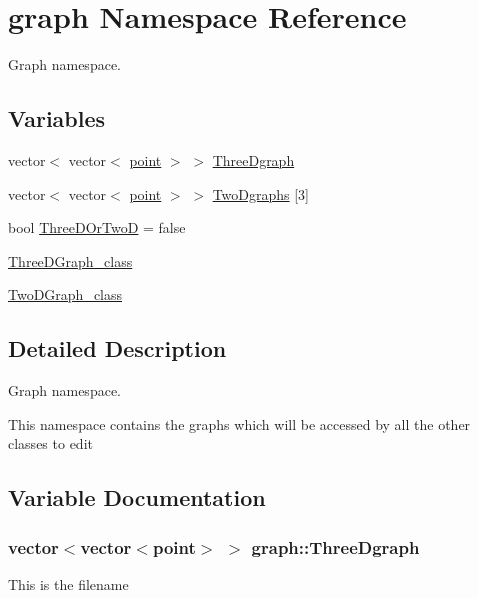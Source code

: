 \hypertarget{namespacegraph}{}\section{graph Namespace Reference}
\label{namespacegraph}


Graph namespace.  


\subsection*{Variables}
\begin{DoxyCompactItemize}
\item 
vector$<$ vector$<$ \hyperlink{structpoint}{point} $>$ $>$ \hyperlink{namespacegraph_a595ffbbb517b17084391c65459fab7ff}{Three\+Dgraph}
\item 
vector$<$ vector$<$ \hyperlink{structpoint}{point} $>$ $>$ \hyperlink{namespacegraph_ac3d5fa2626975ad4c78b6eb5b1dac82f}{Two\+Dgraphs} \mbox{[}3\mbox{]}
\item 
bool \hyperlink{namespacegraph_aaa8a7bf9ccfc70dd98f403db09e1d57f}{Three\+D\+Or\+TwoD} = false
\item 
\hyperlink{namespacegraph_a6d6720407138e1b7385150ec904289ed}{Three\+D\+Graph\+\_\+class}
\item 
\hyperlink{namespacegraph_ac1ee141f058e6cf5c5a0cd0b19461b96}{Two\+D\+Graph\+\_\+class}
\end{DoxyCompactItemize}


\subsection{Detailed Description}
Graph namespace. 

This namespace contains the graphs which will be accessed by all the other classes to edit 

\subsection{Variable Documentation}
\subsubsection[{\texorpdfstring{Three\+Dgraph}{ThreeDgraph}}]{\setlength{\rightskip}{0pt plus 5cm}vector$<$vector$<${\bf point}$>$ $>$ graph\+::\+Three\+Dgraph}\hypertarget{namespacegraph_a595ffbbb517b17084391c65459fab7ff}{}\label{namespacegraph_a595ffbbb517b17084391c65459fab7ff}
This is the filename 
